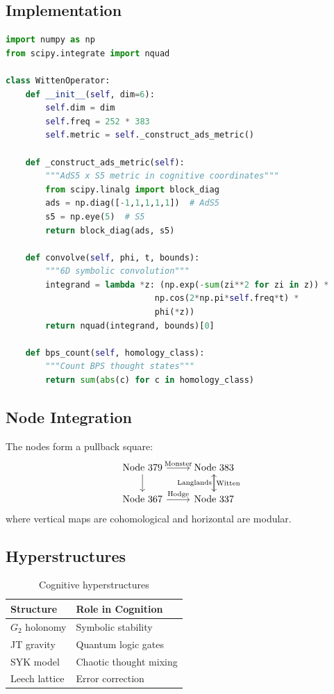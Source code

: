 \documentclass[12pt]{article}
\begin{document}
\subsection{Implementation}
\begin{lstlisting}[language=Python,caption={Thoughtform Engine}]
import numpy as np
from scipy.integrate import nquad

class WittenOperator:
    def __init__(self, dim=6):
        self.dim = dim
        self.freq = 252 * 383
        self.metric = self._construct_ads_metric()
        
    def _construct_ads_metric(self):
        """AdS5 x S5 metric in cognitive coordinates"""
        from scipy.linalg import block_diag
        ads = np.diag([-1,1,1,1,1])  # AdS5
        s5 = np.eye(5)  # S5
        return block_diag(ads, s5)
    
    def convolve(self, phi, t, bounds):
        """6D symbolic convolution"""
        integrand = lambda *z: (np.exp(-sum(zi**2 for zi in z)) * 
                              np.cos(2*np.pi*self.freq*t) * 
                              phi(*z))
        return nquad(integrand, bounds)[0]
    
    def bps_count(self, homology_class):
        """Count BPS thought states"""
        return sum(abs(c) for c in homology_class)
\end{lstlisting}

\subsection{Node Integration}
\begin{theorem}
The nodes form a pullback square:
\[
\begin{tikzcd}
\text{Node 379} \ar[r, "\text{Monster}"] \ar[d] & \text{Node 383} \ar[d, "\text{Witten}"] \\
\text{Node 367} \ar[r, "\text{Hodge}"] & \text{Node 337} \ar[u, "\text{Langlands}"]
\end{tikzcd}
\]
where vertical maps are cohomological and horizontal are modular.
\end{theorem}

\subsection{Hyperstructures}
\begin{table}[h]
\centering
\begin{tabular}{ll}
\toprule
\textbf{Structure} & \textbf{Role in Cognition} \\
\midrule
$G_2$ holonomy & Symbolic stability \\
JT gravity & Quantum logic gates \\
SYK model & Chaotic thought mixing \\
Leech lattice & Error correction \\
\bottomrule
\end{tabular}
\caption{Cognitive hyperstructures}
\end{table}
\end{document}
